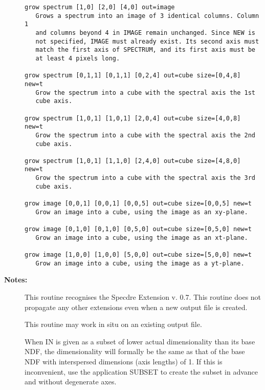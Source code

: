 \begin{description}
\begin{verbatim}
grow spectrum [1,0] [2,0] [4,0] out=image
   Grows a spectrum into an image of 3 identical columns. Column 1
   and columns beyond 4 in IMAGE remain unchanged. Since NEW is
   not specified, IMAGE must already exist. Its second axis must
   match the first axis of SPECTRUM, and its first axis must be
   at least 4 pixels long.

grow spectrum [0,1,1] [0,1,1] [0,2,4] out=cube size=[0,4,8] new=t
   Grow the spectrum into a cube with the spectral axis the 1st
   cube axis.

grow spectrum [1,0,1] [1,0,1] [2,0,4] out=cube size=[4,0,8] new=t
   Grow the spectrum into a cube with the spectral axis the 2nd
   cube axis.

grow spectrum [1,0,1] [1,1,0] [2,4,0] out=cube size=[4,8,0] new=t
   Grow the spectrum into a cube with the spectral axis the 3rd
   cube axis.

grow image [0,0,1] [0,0,1] [0,0,5] out=cube size=[0,0,5] new=t
   Grow an image into a cube, using the image as an xy-plane.

grow image [0,1,0] [0,1,0] [0,5,0] out=cube size=[0,5,0] new=t
   Grow an image into a cube, using the image as an xt-plane.

grow image [1,0,0] [1,0,0] [5,0,0] out=cube size=[5,0,0] new=t
   Grow an image into a cube, using the image as a yt-plane.
\end{verbatim}

\item [{\bf Notes:}]
This routine recognises the Specdre Extension v. 0.7. This
routine does not propagate any other extensions even when a new
output file is created.

This routine may work in situ on an existing output file.

When IN is given as a subset of lower actual dimensionality
than its base NDF, the dimensionality will formally be the same
as that of the base NDF with interspersed dimensions (axis
lengths) of 1. If this is inconvenient, use the application
SUBSET to create the subset in advance and without degenerate
axes.
\end{description}
